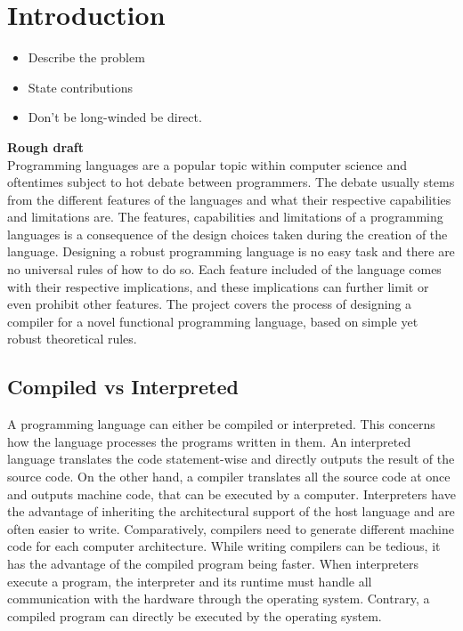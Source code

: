 \chapter{Introduction}
\begin{itemize}
    \item Describe the problem 
    \item State contributions
    \item Don't be long-winded be direct.
\end{itemize}



\textbf{Rough draft}\\
Programming languages are a popular topic within computer science and oftentimes subject to hot debate between programmers. 
The debate usually stems from the different features of the languages and what their respective capabilities and limitations are. 
The features, capabilities and limitations of a programming languages is a consequence of the design choices taken during the creation of the language. 
Designing a robust programming language is no easy task and there are no universal rules of how to do so. 
Each feature included of the language comes with their respective implications, and these implications can further limit or even prohibit other features. 
The project covers the process of designing a compiler for a novel functional programming language, based on simple yet robust theoretical rules. \\

\section{Compiled vs Interpreted}

A programming language can either be compiled or interpreted. This concerns how the language processes the programs written in them. 
An interpreted language translates the code statement-wise and directly outputs the result of the source code. On the other hand, a compiler translates all the source code at once and outputs machine code, that can be executed by a computer. 
Interpreters have the advantage of inheriting the architectural support of the host language and are often easier to write. 
Comparatively, compilers need to generate different machine code for each computer architecture.
While writing compilers can be tedious, it has the
advantage of the compiled program being faster. When interpreters execute
a program, the interpreter and its runtime must handle all communication with the
hardware through the operating system. Contrary, a compiled program can directly be executed by the 
operating system.\\

